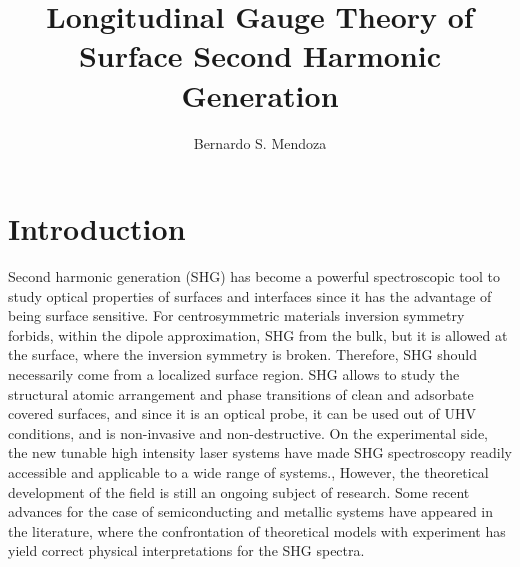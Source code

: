 \documentclass{article}
\begin{document}
\title{Longitudinal Gauge Theory of Surface Second Harmonic Generation}
\author{Bernardo S. Mendoza}



\maketitle
\tableofcontents

\section{Introduction}\label{intro}

Second harmonic generation (SHG) has become a powerful spectroscopic  tool to study optical properties of surfaces and interfaces since it has the advantage of being surface sensitive. For centrosymmetric materials inversion symmetry forbids, within the dipole approximation, SHG from the bulk, but it is allowed at the surface, where the inversion symmetry is broken. Therefore, SHG should necessarily come from a localized surface region. SHG allows to study the structural atomic arrangement and phase transitions of clean and adsorbate covered surfaces, and since it is an optical probe, it can be used out of UHV conditions, and is non-invasive and non-destructive. On the experimental side, the new tunable high intensity laser systems have made SHG spectroscopy readily accessible and applicable to a wide range of systems.\cite{downer_optical_2001},\cite{lupke_characterization_1999} However, the theoretical development of the field is still an ongoing subject of research. Some recent advances for the case of semiconducting and metallic systems have appeared in the literature, where the confrontation of theoretical
models with experiment has yield correct physical interpretations for the SHG spectra.\cite{downer_optical_2001,mendoza_ab_2001,lim_optical_2000,gavrilenko_optical_2000,mendoza_visible-infrared_1999,mendoza_microscopic_1998,mendoza_local-field_1996,mendoza_polarizable-bond_1997,guyot-sionnest_electronic_1990}
\end{document}
